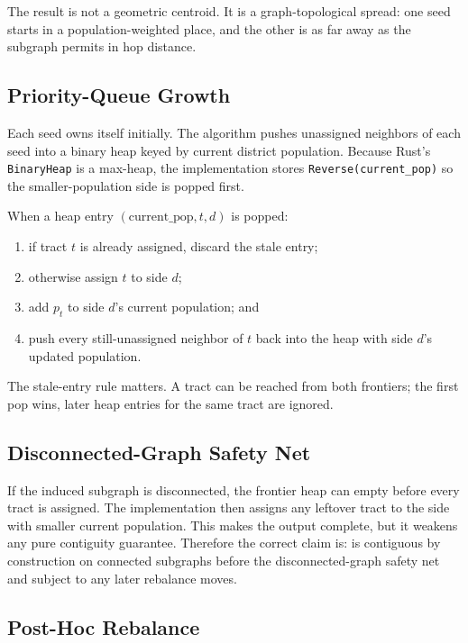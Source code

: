 The result is not a geometric centroid. It is a graph-topological spread: one
seed starts in a population-weighted place, and the other is as far away as the
subgraph permits in hop distance.

\subsection{Priority-Queue Growth}

Each seed owns itself initially. The algorithm pushes unassigned neighbors of
each seed into a binary heap keyed by current district population. Because Rust's
\texttt{BinaryHeap} is a max-heap, the implementation stores
\texttt{Reverse(current\_pop)} so the smaller-population side is popped first.

\begin{definition}
When a heap entry $(\mathrm{current\_pop}, t, d)$ is popped:
\begin{enumerate}
\item if tract $t$ is already assigned, discard the stale entry;
\item otherwise assign $t$ to side $d$;
\item add $p_t$ to side $d$'s current population; and
\item push every still-unassigned neighbor of $t$ back into the heap with
  side $d$'s updated population.
\end{enumerate}
\end{definition}

The stale-entry rule matters. A tract can be reached from both frontiers; the
first pop wins, later heap entries for the same tract are ignored.

\subsection{Disconnected-Graph Safety Net}

If the induced subgraph is disconnected, the frontier heap can empty before
every tract is assigned. The implementation then assigns any leftover tract to
the side with smaller current population. This makes the output complete, but
it weakens any pure contiguity guarantee. Therefore the correct claim is:
\bfsg{} is contiguous by construction on connected subgraphs before the
disconnected-graph safety net and subject to any later rebalance moves.

\subsection{Post-Hoc Rebalance}

